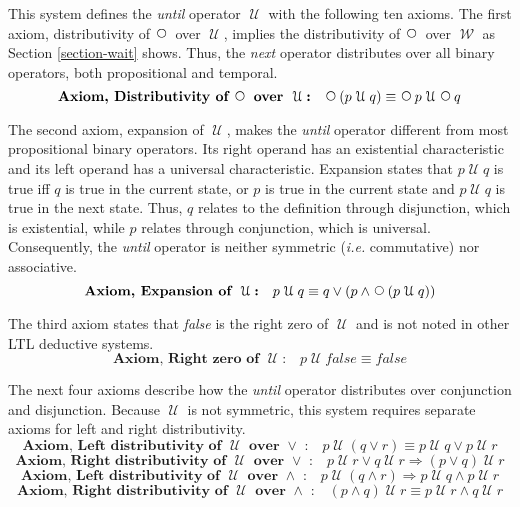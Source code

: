 \documentclass[12pt, fleqn, leqno]{article}
\newcommand{\impl}{\ensuremath{\Rightarrow}}        %
\newcommand{\Until}{\;\mathcal{U}\;}
\newcommand{\Wait}{\;\mathcal{W}\;}
\newcommand{\Next}{\;\,\text{\raisebox{3.5pt}{\circle{6}}}}
\begin{document}
This system defines the \textit{until} operator $\Until$ with the following ten axioms.
The first axiom, distributivity of $\Next$ over $\Until$, implies the distributivity of $\Next$ over $\Wait$ as Section \ref{section-wait} shows.
Thus, the \textit{next} operator distributes over all binary operators, both propositional and temporal.
\begin{equation}\label{E:distNextUntil}
\textbf{Axiom, Distributivity of $\Next$ over $\Until$:}\quad \Next (p \Until q) \equiv \Next p \Until \Next q
\end{equation}

The second axiom, expansion of $\Until$, makes the \textit{until} operator different from most propositional binary operators.
Its right operand has an existential characteristic and its left operand has a universal characteristic.
Expansion  states that
$p\Until q$ is true iff $q$ is true in the current state, or $p$ is true in the current state and $p\Until q$ is
true in the next state.
Thus, $q$ relates to the definition through disjunction, which is existential,
while $p$ relates through conjunction, which is universal.
Consequently, the \textit{until} operator is neither symmetric (\textit{i.e.} commutative) nor associative.
\begin{equation}\label{E:expansionUntil}
\textbf{Axiom, Expansion of $\Until$:}\quad p \Until q \equiv q \lor (p \land \Next (p \Until q))
\end{equation}

The third axiom states that \textit{false} is the right zero of $\Until$ and is not noted in other LTL deductive systems.
\begin{equation}\label{E:untilFalse}
\textbf{Axiom, Right zero of $\Until$:}\quad p \Until \mathit{false} \equiv \mathit{false}
\end{equation}

The next four axioms describe how the \textit{until} operator distributes over conjunction and disjunction.
Because $\Until$ is not symmetric, this system requires separate axioms for left and right distributivity.
\begin{equation}\label{E:untilOrEquiv}
\textbf{Axiom, Left distributivity of $\Until$ over $\lor$ :}\quad p \Until (q \lor r) \equiv p \Until q \lor p \Until r
\end{equation}
\begin{equation}\label{E:untilOrImp}
\textbf{Axiom, Right distributivity of $\Until$ over $\lor$ :}\quad p \Until r \lor q \Until r \impl (p \lor q) \Until r
\end{equation}
\begin{equation}\label{E:untilAndImp}
\textbf{Axiom, Left distributivity of $\Until$ over $\land$ :}\quad p \Until (q \land r) \impl p \Until q \land p \Until r
\end{equation}
\begin{equation}\label{E:untilAndEquiv}
\textbf{Axiom, Right distributivity of $\Until$ over $\land$ :}\quad (p \land q) \Until r \equiv p \Until r \land q \Until r
\end{equation}
\end{document}
